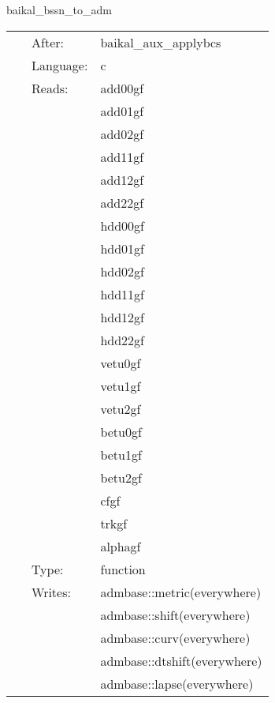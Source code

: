 \vspace{5mm}


\hspace{5mm} baikal\_bssn\_to\_adm 

\hspace{5mm}{\it perform bssn-to-adm conversion in mol\_pseudoevolution. needed for proper hydrobase integration. } 


\hspace{5mm}

 \begin{tabular*}{160mm}{cll} 
~ & After:  & baikal\_aux\_applybcs \\ 
~ & Language:  & c \\ 
~ & Reads:  & add00gf \\ 
~& ~ &add01gf\\ 
~& ~ &add02gf\\ 
~& ~ &add11gf\\ 
~& ~ &add12gf\\ 
~& ~ &add22gf\\ 
~& ~ &hdd00gf\\ 
~& ~ &hdd01gf\\ 
~& ~ &hdd02gf\\ 
~& ~ &hdd11gf\\ 
~& ~ &hdd12gf\\ 
~& ~ &hdd22gf\\ 
~& ~ &vetu0gf\\ 
~& ~ &vetu1gf\\ 
~& ~ &vetu2gf\\ 
~& ~ &betu0gf\\ 
~& ~ &betu1gf\\ 
~& ~ &betu2gf\\ 
~& ~ &cfgf\\ 
~& ~ &trkgf\\ 
~& ~ &alphagf\\ 
~ & Type:  & function \\ 
~ & Writes:  & admbase::metric(everywhere) \\ 
~& ~ &admbase::shift(everywhere)\\ 
~& ~ &admbase::curv(everywhere)\\ 
~& ~ &admbase::dtshift(everywhere)\\ 
~& ~ &admbase::lapse(everywhere)\\ 
\end{tabular*} 


\vspace{5mm}

